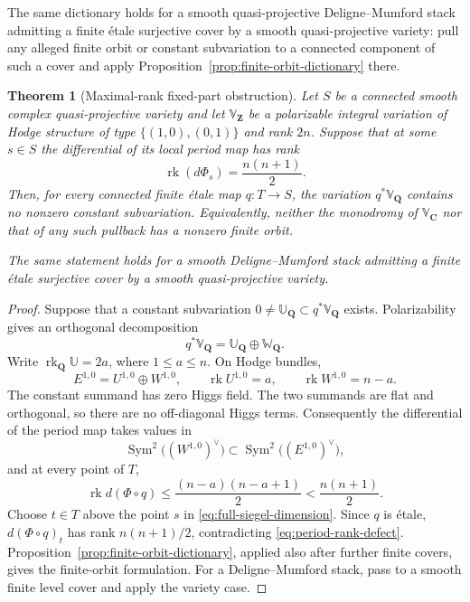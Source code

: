 \documentclass[11pt,reqno]{amsart}
\numberwithin{equation}{section}
\newtheorem{theorem}{Theorem}[section]
\theoremstyle{definition}
\theoremstyle{remark}
\newcommand{\C}{\mathbf C}
\newcommand{\Q}{\mathbf Q}
\newcommand{\Z}{\mathbf Z}
\newcommand{\rk}{\operatorname{rk}}
\newcommand{\Sym}{\operatorname{Sym}}
\begin{document}
The same dictionary holds for a smooth quasi-projective Deligne--Mumford stack admitting a finite \'etale surjective cover by a smooth quasi-projective variety: pull any alleged finite orbit or constant subvariation to a connected component of such a cover and apply Proposition~\ref{prop:finite-orbit-dictionary} there.

\begin{theorem}[Maximal-rank fixed-part obstruction]\label{thm:no-fixed-part}
Let $S$ be a connected smooth complex quasi-projective variety and let $\mathbb V_{\Z}$ be a polarizable integral variation of Hodge structure of type $\{(1,0),(0,1)\}$ and rank $2n$.  Suppose that at some $s\in S$ the differential of its local period map has rank
\begin{equation}\label{eq:full-siegel-dimension}
\rk(d\Phi_s)=\frac{n(n+1)}2.
\end{equation}
Then, for every connected finite \'etale map $q:T\to S$, the variation $q^*\mathbb V_{\Q}$ contains no nonzero constant subvariation.  Equivalently, neither the monodromy of $\mathbb V_{\C}$ nor that of any such pullback has a nonzero finite orbit.

The same statement holds for a smooth Deligne--Mumford stack admitting a finite \'etale surjective cover by a smooth quasi-projective variety.
\end{theorem}

\begin{proof}
Suppose that a constant subvariation
$0\ne\mathbb U_{\Q}\subset q^*\mathbb V_{\Q}$ exists.  Polarizability gives an orthogonal decomposition
\[
q^*\mathbb V_{\Q}=\mathbb U_{\Q}\oplus\mathbb W_{\Q}.
\]
Write $\rk_{\Q}\mathbb U=2a$, where $1\le a\le n$.  On Hodge bundles,
\[
E^{1,0}=U^{1,0}\oplus W^{1,0},
\qquad \rk U^{1,0}=a,
\qquad \rk W^{1,0}=n-a.
\]
The constant summand has zero Higgs field.  The two summands are flat and orthogonal, so there are no off-diagonal Higgs terms.  Consequently the differential of the period map takes values in
\[
\Sym^2\bigl((W^{1,0})^\vee\bigr)
\subset\Sym^2\bigl((E^{1,0})^\vee\bigr),
\]
and at every point of $T$,
\begin{equation}\label{eq:period-rank-defect}
\rk d(\Phi\circ q)
\le\frac{(n-a)(n-a+1)}2
<\frac{n(n+1)}2.
\end{equation}
Choose $t\in T$ above the point $s$ in \eqref{eq:full-siegel-dimension}.  Since $q$ is \'etale, $d(\Phi\circ q)_t$ has rank $n(n+1)/2$, contradicting \eqref{eq:period-rank-defect}.  Proposition~\ref{prop:finite-orbit-dictionary}, applied also after further finite covers, gives the finite-orbit formulation.  For a Deligne--Mumford stack, pass to a smooth finite level cover and apply the variety case.
\end{proof}
\end{document}

